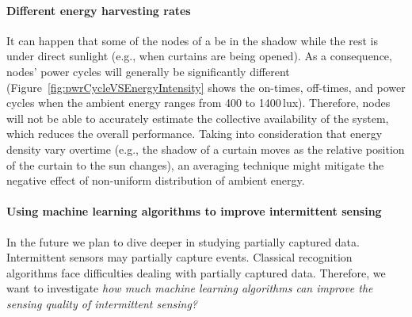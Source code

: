 \paragraph{Different energy harvesting rates}
It can happen that some of the nodes of a \cis be in the shadow while the rest is under direct sunlight (e.g., when curtains are being opened). 
As a consequence, nodes' power cycles will generally be significantly different (Figure~\ref{fig:pwrCycleVSEnergyIntensity} shows the on-times, off-times, and power cycles when the ambient energy ranges from 400 to 1400\,lux). Therefore, nodes will not be able to accurately estimate the collective availability of the system, which reduces the overall performance. 
Taking into consideration that energy density vary overtime (e.g., the shadow of a curtain moves as the relative position of the curtain to the sun changes), an averaging technique might mitigate the negative effect of non-uniform distribution of ambient energy. 

\paragraph{Using machine learning algorithms to improve intermittent sensing}
In the future we plan to dive deeper in studying partially captured data. 
Intermittent sensors may partially capture events. Classical recognition 
algorithms face difficulties dealing with partially captured data. 
Therefore, we want to investigate \emph{how much machine learning algorithms 
can improve the sensing quality of intermittent sensing?} 